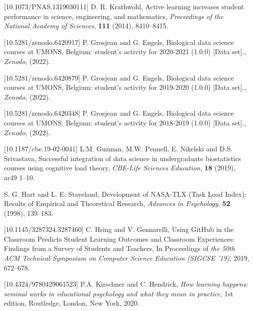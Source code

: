 \documentclass{aims}
\theoremstyle{definition}
\begin{document}
\begin{thebibliography}{99}
 [10.1073/PNAS.1319030111]
     \newblock  D. R. Krathwohl,
     \newblock Active learning increases student performance in science, engineering, and mathematics,
     \newblock \emph{Proceedings of the National Academy of Sciences}, \textbf{111} (2014), 8410--8415.

 [10.5281/zenodo.6420917]
     \newblock P. Grosjean and G. Engels,
     \newblock Biological data science courses at UMONS, Belgium: student's activity for 2020-2021 (1.0.0) [Data set].,
     \newblock \emph{Zenodo}, (2022).

 [10.5281/zenodo.6420879]
     \newblock P. Grosjean and G. Engels,
     \newblock Biological data science courses at UMONS, Belgium: student's activity for 2019-2020 (1.0.0) [Data set].,
     \newblock \emph{Zenodo}, (2022).

 [10.5281/zenodo.6420348]
     \newblock P. Grosjean and G. Engels,
     \newblock Biological data science courses at UMONS, Belgium: student's activity for 2018-2019 (1.0.0) [Data set].,
     \newblock \emph{Zenodo}, (2022).

 [10.1187/cbe.19-02-0041]
     \newblock L.M. Guzman, M.W. Pennell, E. Nikelski and D.S. Srivastava,
     \newblock Successful integration of data science in undergraduate biostatistics courses using cognitive load theory,
     \newblock \emph{CBE-Life Sciences Education}, \textbf{18} (2019), ar49 1--10.

     \newblock S. G. Hart and L. E. Staveland,
     \newblock Development of NASA-TLX (Task Load Index): Results of Empirical and Theoretical Research,
     \newblock \emph{Advances in Psychology}, \textbf{52} (1998), 139--183.

 [10.1145/3287324.3287460]
     \newblock C. Hsing and V. Gennarelli,
     \newblock Using GitHub in the Classroom Predicts Student Learning Outcomes and Classroom Experiences: Findings from a Survey of Students and Teachers,
     \newblock In Proceedings of \emph{the 50th ACM Technical Symposium on Computer Science Education (SIGCSE '19)}, 2019, 672–678.

 [10.4324/9780429061523]
     \newblock P.A. Kirschner and C. Hendrick,
     \newblock \emph{How learning happens: seminal works in educational psychology and what they mean in practice},
     \newblock 1st edition, Routledge, London, New York, 2020.


\end{thebibliography}
\end{document}
